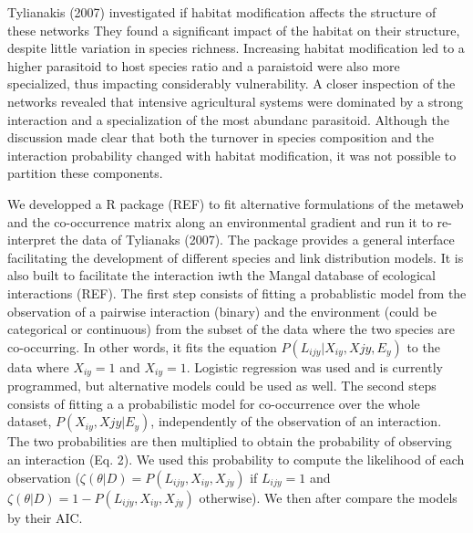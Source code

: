 \documentclass[12pt]{article}
\begin{document}
Tylianakis (2007) investigated if habitat modification affects the structure of
these networks They found a significant impact of the habitat on their
structure, despite little variation in species richness. Increasing habitat
modification led to a higher parasitoid to host species ratio and a paraistoid
were also more specialized, thus impacting considerably vulnerability. A closer
inspection of the networks revealed that intensive agricultural systems were
dominated by a strong interaction and a specialization of the most abundanc
parasitoid. Although the discussion made clear that both the turnover in species
composition and the interaction probability changed with habitat modification,
it was not possible to partition these components.
 
We developped a R package (REF) to fit alternative formulations of the metaweb
and the co-occurrence matrix along an environmental gradient and run it to
re-interpret the data of Tylianaks (2007). The package provides a general
interface facilitating the development of different species and link
distribution models. It is also built to facilitate the interaction iwth the
Mangal database of ecological interactions (REF). The first step consists of
fitting a probablistic model from the observation of a pairwise interaction
(binary) and the environment (could be categorical or continuous) from the
subset of the data where the two species are co-occurring. In other words, it
fits the equation $P(L_{ijy}|X_{iy},X{jy},E_y)$ to the data where $X_{iy} = 1$
and $X_{iy} = 1$. Logistic regression was used and is currently programmed, but
alternative models could be used as well. The second steps consists of fitting a
a probabilistic model for co-occurrence over the whole dataset,
$P(X_{iy},X{jy}|E_y)$, independently of the observation of an interaction. The
two probabilities are then multiplied to obtain the probability of observing an
interaction (Eq. 2). We used this probability to compute the likelihood of each
observation ($\zeta(\theta|D) = P(L_{ijy},X_{iy},X_{jy})$ if $L_{ijy}=1$ and
$\zeta(\theta|D) = 1 - P(L_{ijy},X_{iy},X_{jy})$ otherwise). We then after
compare the models by their AIC.
\end{document}
